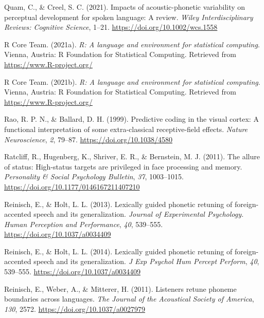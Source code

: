 \documentclass[
  11pt,
  english,
  man,floatsintext]{apa6}
\newlength{\cslhangindent}
\newlength{\cslentryspacingunit} %
\newenvironment{CSLReferences}[2] %
 {%
  \setlength{\parindent}{0pt}
  \ifodd #1
  \let\oldpar\par
  \def\par{\hangindent=\cslhangindent\oldpar}
  \fi
  \setlength{\parskip}{#2\cslentryspacingunit}
 }%
 {}
\begin{document}
\begin{CSLReferences}{1}{0}
\leavevmode{}%
Quam, C., \& Creel, S. C. (2021). Impacts of acoustic-phonetic variability on perceptual development for spoken language: A review. \emph{Wiley Interdisciplinary Reviews: Cognitive Science}, 1--21. \url{https://doi.org/10.1002/wcs.1558}

\leavevmode{}%
R Core Team. (2021a). \emph{R: A language and environment for statistical computing}. Vienna, Austria: R Foundation for Statistical Computing. Retrieved from \url{https://www.R-project.org/}

\leavevmode{}%
R Core Team. (2021b). \emph{R: A language and environment for statistical computing}. Vienna, Austria: R Foundation for Statistical Computing. Retrieved from \url{https://www.R-project.org/}

\leavevmode{}%
Rao, R. P. N., \& Ballard, D. H. (1999). Predictive coding in the visual cortex: A functional interpretation of some extra-classical receptive-field effects. \emph{Nature Neuroscience}, \emph{2}, 79--87. \url{https://doi.org/10.1038/4580}

\leavevmode{}%
Ratcliff, R., Hugenberg, K., Shriver, E. R., \& Bernstein, M. J. (2011). The allure of status: High-status targets are privileged in face processing and memory. \emph{Personality \& Social Psychology Bulletin}, \emph{37}, 1003--1015. \url{https://doi.org/10.1177/0146167211407210}

\leavevmode{}%
Reinisch, E., \& Holt, L. L. (2013). Lexically guided phonetic retuning of foreign-accented speech and its generalization. \emph{Journal of Experimental Psychology. Human Perception and Performance}, \emph{40}, 539--555. \url{https://doi.org/10.1037/a0034409}

\leavevmode{}%
Reinisch, E., \& Holt, L. L. (2014). Lexically guided phonetic retuning of foreign-accented speech and its generalization. \emph{J Exp Psychol Hum Percept Perform}, \emph{40}, 539--555. \url{https://doi.org/10.1037/a0034409}

\leavevmode{}%
Reinisch, E., Weber, A., \& Mitterer, H. (2011). Listeners retune phoneme boundaries across languages. \emph{The Journal of the Acoustical Society of America}, \emph{130}, 2572. \url{https://doi.org/10.1037/a0027979}


\end{CSLReferences}
\end{document}

